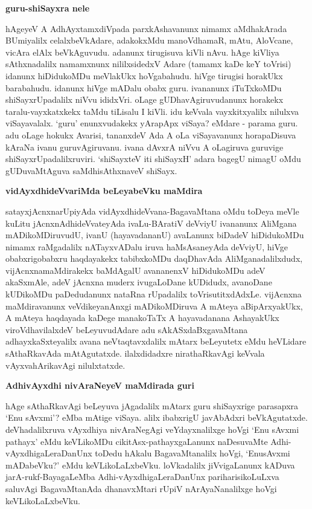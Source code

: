 {\bigskip
\noindent
{\large\bf guru-shiSayxra nele}}\label{page66a}
\medskip

\noindent
hAgeyeV A AdhAyxtamxdiVpada parxkAshavanunx nimamx aMdhakArada BUmiyalilx celalxbeVkAdare, adakokxMdu manoVdhamaR, mAtu, AloVcane, vicAra elAlx beVkAguvudu. adanunx tirugisuva kiVli nAvu. hAge kiVliya sAthxnadalilx namamxnunx nililxsidedxV Adare (tamamx kaDe keY toVrisi) idanunx hiDidukoMDu meVlakUkx hoVgabahudu. hiVge tirugisi horakUkx barabahudu. idanunx hiVge mADalu obabx guru. ivananunx iTuTxkoMDu shiSayxrUpadalilx niVvu ididxVri. oLage gUDhavAgiruvudanunx horakekx taralu-vayxkatxkekx taMdu tiLisalu I kiVli. idu keVvala vayxkitxyalilx nilulxva viSayavalalx. `guru' enunxvudakekx yArapApx viSaya? eMdare - parama guru. adu oLage hokukx Avarisi, tananxdeV Ada A oLa viSayavanunx horapaDisuva kAraNa ivanu guruvAgiruvanu. ivana dAvxrA niVvu A oLagiruva guruvige shiSayxrUpadalilxruviri. `shiSayxteV iti shiSayxH' adara bagegU nimagU oMdu gUDuvaMtAguva saMdhisAthxnaveV shiSayx.

{\bigskip
\noindent
{\large\bf vidAyxdhideVvariMda beLeyabeVku maMdira}}\label{page66b}
\medskip

\noindent
satayxjAcnxnarUpiyAda vidAyxdhideVvana-BagavaMtana oMdu toDeya meVle kuLitu jAcnxnAdhideVvateyAda ivaLu-BAratiV deVviyU ivananunx AliMgana mADikoMDiruvudU, ivanU (hayavadananU) avaLanunx biDadeV hiDidukoMDu \hbox{nimamx} raMgadalilx nATayxvADalu iruva haMsAsaneyAda deVviyU, hiVge obabxrigobabxru haqdayakekx tabibxkoMDu daqDhavAda AliMganadalilxdudx, vijAcnxnamaMdirakekx baMdAgalU avananenxV hiDidukoMDu adeV akaSxmAle, adeV jAcnxna muderx ivugaLoDane kUDidudx, avanoDane kUDikoMDu paDedudanunx nataRna rUpadalilx toVrisutitxdAdxLe. vijAcnxna maMdiravanunx veVdikeyanAnxgi mADikoMDiruva A mAteya aBipArxyakUkx, A mAteya haqdayada kaDege manakoTaTx A hayavadanana AshayakUkx viroVdhavilalxdeV beLeyuvudAdare adu sAkASxdaBxgavaMtana adhayxkaSxteyalilx avana neVtaqtavxdalilx mAtarx beLeyutetx eMdu heVLidare sAthaRkavAda mAtAgutatxde. ilalxdidadxre nirathaRkavAgi keVvala vAyxvahArikavAgi nilulxtatxde.

{\bigskip
\noindent
{\large\bf AdhivAyxdhi nivAraNeyeV maMdirada guri}}\label{page67}
\medskip

\noindent
hAge sAthaRkavAgi beLeyuva jAgadalilx mAtarx guru shiSayxrige parasapxra `Enu sAvxmi'? eMba mAtige viSaya. alilx ibabxrigU javAbAdxri beVkAgutatxde. deVhadalilxruva vAyxdhiya nivAraNegAgi veYdayxnalilxge hoVgi `Enu sAvxmi pathayx' eMdu keVLikoMDu cikitAsx-pathayxgaLanunx naDesuvaMte Adhi-vAyxdhigaLeraDanUnx toDedu hAkalu BagavaMtanalilx hoVgi, `EnusAvxmi mADabeVku?' eMdu keVLikoLaLxbeVku. loVkadalilx jiVvigaLanunx kADuva jarA-rukf-BayagaLeMba Adhi-vAyxdhigaLeraDanUnx pariharisikoLuLxva saluvAgi BagavaMtanAda dhanavxMtari rUpiV nArAyaNanalilxge hoVgi keVLikoLaLxbeVku.

